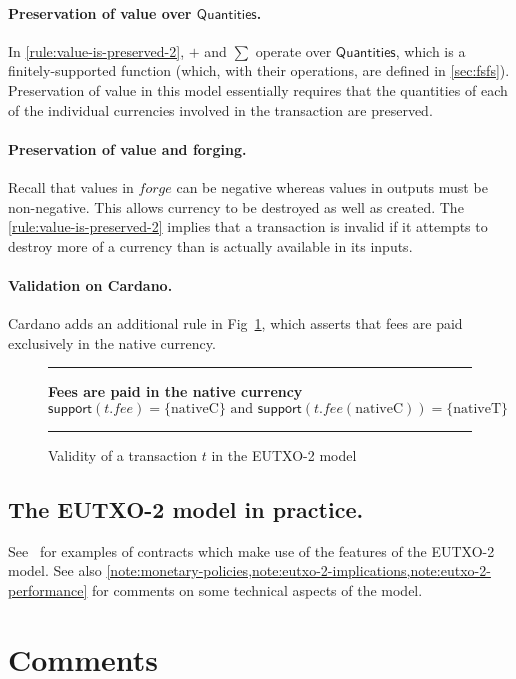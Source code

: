 \documentclass[a4paper]{article}
\newcounter{note}
\newcommand{\s}{\textsf}  %
\newcommand{\msf}[1]{\ensuremath{\mathsf{#1}}}
\newcommand{\mi}[1]{\ensuremath{\mathit{#1}}}
\newcommand\rfskip{7pt}
\newenvironment{ruledfigure}[1]{\begin{figure}[#1]\hrule\vspace{\rfskip}}{\vspace{\rfskip}\hrule\end{figure}}
\newcommand{\support}{\msf{support}}
\newcommand{\forge}{\mi{forge}}
\newcommand{\fee}{\mi{fee}}
\newcommand{\nativeCur}{\ensuremath{\mathrm{nativeC}}}
\newcommand{\nativeTok}{\ensuremath{\mathrm{nativeT}}}
\newcommand{\qtymap}{\ensuremath{\s{Quantities}}}
\begin{document}
\paragraph{Preservation of value over \qtymap{}.}
In \cref{rule:value-is-preserved-2},
$+$ and $\sum$ operate over \qtymap{}, which is
a finitely-supported function (which, with their operations,
are defined in \cref{sec:fsfs}). Preservation of value
in this model essentially requires that the
quantities of each of the individual currencies involved in the
transaction are preserved.

\paragraph{Preservation of value and forging.}
Recall that values in $\forge$ can
be negative whereas values in outputs must be non-negative. This allows
currency to be destroyed as well as created. The
\cref{rule:value-is-preserved-2} implies that a
transaction is invalid if it attempts to destroy more of a currency
than is actually available in its inputs.

\paragraph{Validation on Cardano.}
Cardano adds an additional rule in Fig~\ref{fig:cardano-fee-validity}, which
asserts that fees are paid exclusively in the native currency.

\begin{ruledfigure}{H}
  \textbf{Fees are paid in the native currency}
  \begin{displaymath}
    \support(t.\fee) = \{ \nativeCur \} \textrm{ and }
    \support(t.\fee(\nativeCur)) = \{ \nativeTok \}
  \end{displaymath}
  \caption{Validity of a transaction $t$ in the EUTXO-2 model}
  \label{fig:cardano-fee-validity}
\end{ruledfigure}

\subsection{The EUTXO-2 model in practice.}
See~\cite{Plutus-book} for examples of contracts which make use of the
features of the EUTXO-2 model.  See also
\cref{note:monetary-policies,note:eutxo-2-implications,note:eutxo-2-performance}
for comments on some technical aspects of the model.

\appendix
\section{Comments}
\label{appendix:comments}
\end{document}
